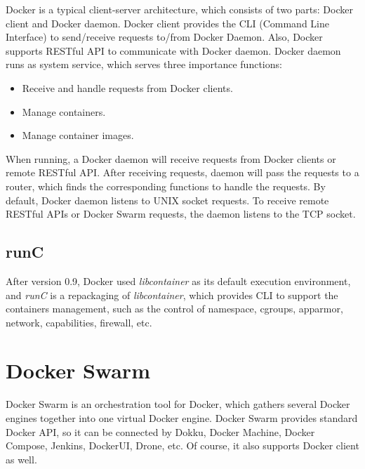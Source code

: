 Docker is a typical client-server architecture, which consists of two parts: Docker client and Docker daemon. Docker client provides the CLI (Command Line Interface) to send/receive requests to/from Docker Daemon.  Also, Docker supports RESTful API \cite{christensen2009using} to communicate with Docker daemon. Docker daemon runs as system service, which serves three  importance functions: 
\begin{itemize}
    \item Receive and handle requests from Docker clients.
    \item Manage containers.
    \item Manage container images.
\end{itemize}
When running, a Docker daemon will receive requests from Docker clients or remote RESTful API. After receiving requests, daemon will pass the requests to a router, which finds the corresponding functions to handle the requests. By default, Docker daemon listens to UNIX socket requests.  To receive remote RESTful APIs or Docker Swarm requests, the daemon listens to the TCP socket.

\subsection{runC}
After version 0.9, Docker used \emph{libcontainer} as its default execution environment, and \emph{runC} \cite{runc} is a repackaging of \emph{libcontainer}, which provides CLI to support the containers management, such as the control of namespace, cgroups, apparmor, network, capabilities, firewall, etc.

\section{Docker Swarm}

Docker Swarm is an orchestration tool for Docker, which gathers several Docker engines together into one virtual Docker engine. Docker Swarm provides standard Docker API, so it can be connected by Dokku, Docker Machine, Docker Compose, Jenkins, DockerUI, Drone, etc. Of course, it also supports Docker client as well.

